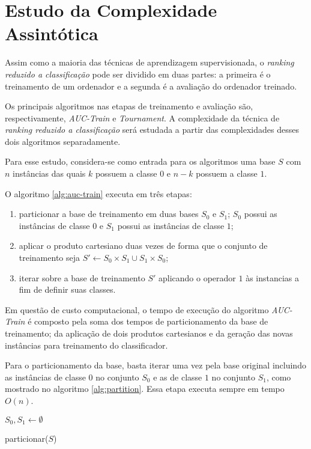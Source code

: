 \section{Estudo da Complexidade Assintótica}

Assim como a maioria das técnicas de aprendizagem supervisionada, o \emph{ranking reduzido a classificação} pode ser dividido em duas partes: a primeira é o treinamento de um ordenador e a segunda é a avaliação do ordenador treinado.

Os principais algoritmos nas etapas de treinamento e avaliação são, respectivamente, \emph{AUC-Train} e \emph{Tournament}. A complexidade da técnica de \emph{ranking reduzido a classificação} será estudada a partir das complexidades desses dois algoritmos separadamente.

Para esse estudo, considera-se como entrada para os algoritmos uma base $S$ com $n$ instâncias das quais $k$ possuem a classe $0$ e $n - k$ possuem a classe $1$.

O algoritmo \ref{alg:auc-train} executa em três etapas:

\begin{enumerate}
    \item particionar a base de treinamento em duas bases $S_0$ e $S_1$; $S_0$ possui as instâncias de classe $0$ e $S_1$ possui as instâncias de classe $1$;
    \item aplicar o produto cartesiano duas vezes de forma que o conjunto de treinamento seja $S' \gets S_0 \times S_1 \cup S_1 \times S_0$;
    \item iterar sobre a base de treinamento $S'$ aplicando o operador $1$ às instancias a fim de definir suas classes.
\end{enumerate}

Em questão de custo computacional, o tempo de execução do algoritmo \emph{AUC-Train} é composto pela soma dos tempos de particionamento da base de treinamento; da aplicação de dois produtos cartesianos e da geração das novas instâncias para treinamento do classificador.

Para o particionamento da base, basta iterar uma vez pela base original incluindo as instâncias de classe $0$ no conjunto $S_0$ e as de classe $1$ no conjunto $S_1$, como mostrado no algoritmo \ref{alg:partition}. Essa etapa executa sempre em tempo $O(n)$.

\begin{function}

        $S_0, S_1 \gets \emptyset$



    \caption{particionar($S$)}
    \label{alg:partition}
\end{function}

